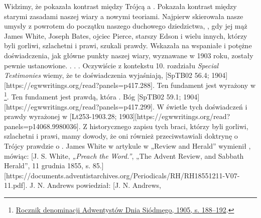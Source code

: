 Widzimy, że pokazała kontrast między Trójcą a . Pokazała kontrast między starymi zasadami naszej wiary a nowymi teoriami. Najpierw skierowała nasze umysły z powrotem do początku naszego duchowego dziedzictwa, , gdy jej mąż James White, Joseph Bates, ojciec Pierce, starszy Edson i wielu innych, którzy byli gorliwi, szlachetni i prawi, szukali prawdy. Wskazała na wspaniałe i potężne doświadczenia, jak główne punkty naszej wiary, wyznawane w 1903 roku, zostały pewnie ustanowione. . . . Oczywiście z kontekstu 10. rozdziału \textit{Special Testimonies} wiemy, że te doświadczenia wyjaśniają, [SpTB02 56.4; 1904][https://egwwritings.org/read?panels=p417.288]. Ten fundament jest wyrażony w \footnote{\href{https://static1.squarespace.com/static/554c4998e4b04e89ea0c4073/t/59d17e24c027d84167e17617/1506901547915/SDA-YB1905+\%28P.+188-192\%29.pdf}{Rocznik denominacji Adwentystów Dnia Siódmego, 1905, s. 188--192}.}. Ten fundament jest prawdą, która . Bóg [SpTB02 59.1; 1904][https://egwwritings.org/read?panels=p417.299]. W świetle tych doświadczeń i prawdy wyrażonej w  [Lt253-1903.28; 1903][https://egwwritings.org/read?panels=p14068.9980036]. Z historycznego zapisu tych braci, którzy byli gorliwi, szlachetni i prawi, mamy dowody, że oni również przeciwstawiali doktrynę o Trójcy prawdzie o . James White w artykule w „Review and Herald” wymienił , mówiąc: [J. S. White, \textit{„Preach the Word.”}, „The Advent Review, and Sabbath Herald”, 11 grudnia 1855, s. 85.][https://documents.adventistarchives.org/Periodicals/RH/RH18551211-V07-11.pdf]. J. N. Andrews powiedział: [J. N. Andrews, 
